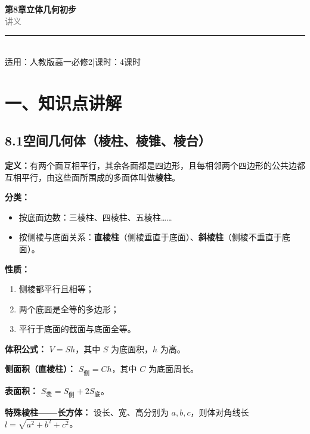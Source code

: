 \documentclass[12pt, a4paper]{ctexart}
\begin{document}
\begin{center}
{\Huge\bfseries\textcolor{mainblue}{第8章\quad 立体几何初步}}\\[12pt]
{\Large\textcolor{gray}{讲\quad 义}}\\[8pt]
\rule{0.6\textwidth}{1pt}\\[8pt]
{\normalsize 适用：人教版\quad 高一必修2\quad |\quad 课时：4课时}
\end{center}
\vspace{10pt}

\section*{\textcolor{mainblue}{一、知识点讲解}}

\subsection*{8.1\quad 空间几何体（棱柱、棱锥、棱台）}

\begin{knowledgebox}[【知识1】棱柱]
\textbf{定义：}有两个面互相平行，其余各面都是四边形，且每相邻两个四边形的公共边都互相平行，由这些面所围成的多面体叫做\textbf{棱柱}。

\medskip
\textbf{分类：}
\begin{itemize}[leftmargin=2em]
  \item 按底面边数：三棱柱、四棱柱、五棱柱……
  \item 按侧棱与底面关系：\textbf{直棱柱}（侧棱垂直于底面）、\textbf{斜棱柱}（侧棱不垂直于底面）。
\end{itemize}

\textbf{性质：}
\begin{enumerate}[leftmargin=2em]
  \item 侧棱都平行且相等；
  \item 两个底面是全等的多边形；
  \item 平行于底面的截面与底面全等。
\end{enumerate}

\textbf{体积公式：} $V = Sh$，其中 $S$ 为底面积，$h$ 为高。

\medskip
\textbf{侧面积（直棱柱）：} $S_{\text{侧}} = Ch$，其中 $C$ 为底面周长。

\medskip
\textbf{表面积：} $S_{\text{表}} = S_{\text{侧}} + 2S_{\text{底}}$。

\medskip
\textbf{特殊棱柱——长方体：}
设长、宽、高分别为 $a, b, c$，则体对角线长 $l = \sqrt{a^2 + b^2 + c^2}$。
\end{knowledgebox}
\end{document}
